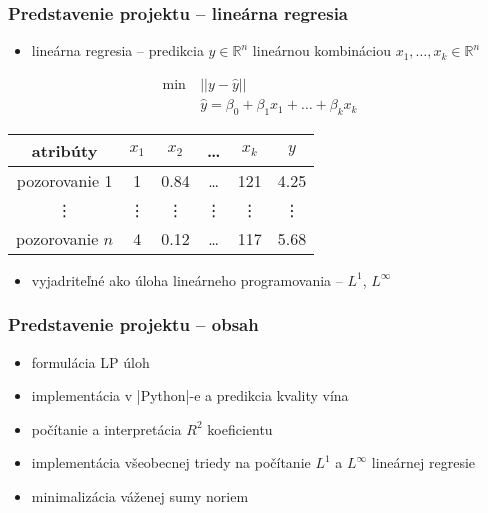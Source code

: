 \documentclass[presentation.tex]{subfiles}
\begin{document}
\begin{frame}

\frametitle{Predstavenie projektu -- lineárna regresia}
\begin{itemize}
	\item lineárna regresia -- predikcia $y \in \mathbb{R}^n$ lineárnou kombináciou $x_1,\dots,x_k \in \mathbb{R}^n$
\end{itemize}
\begin{align*}
	\min~&||y - \hat{y}|| \\
	&\hat{y} = \beta_0 + \beta_1x_1 + \dots + \beta_kx_k
\end{align*}

\begin{center}
	\small
	\begin{tabular}{| c | c  c  c  c  c |}
		\hline
		atribúty & $x_1$ & $x_2$ & \dots & $x_k$ & $y$ \\
		\hline
		pozorovanie 1 & 1 & 0.84 & \dots & 121 & 4.25 \\
		\vdots & \vdots & \vdots & \vdots & \vdots & \vdots \\
		pozorovanie $n$ & 4 & 0.12 & \dots & 117 & 5.68 \\
		\hline
	\end{tabular}
\end{center}

\begin{itemize}
	\item vyjadriteľné ako úloha lineárneho programovania -- $L^1$, $L^{\infty}$
\end{itemize}

\end{frame}

\begin{frame}
	\frametitle{Predstavenie projektu -- obsah}

\begin{itemize}
	\item formulácia LP úloh 
	\item implementácia v \pyth|Python|-e a predikcia kvality vína
	\item počítanie a interpretácia $R^2$ koeficientu
	\item implementácia všeobecnej triedy na počítanie $L^1$ a $L^{\infty}$ lineárnej regresie
	\item minimalizácia váženej sumy noriem
\end{itemize}

\end{frame}


	
\end{document}
